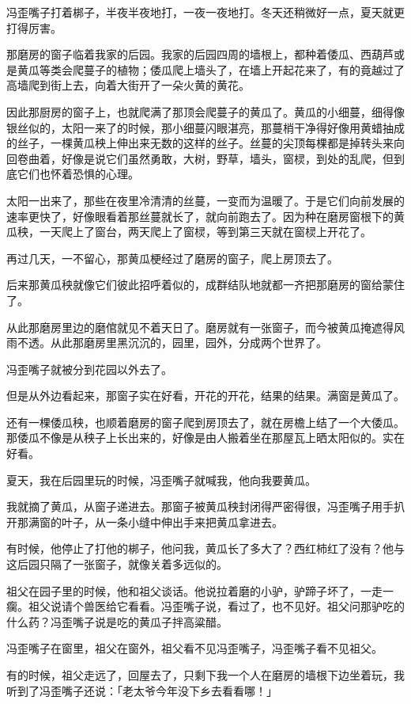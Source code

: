 \documentclass[UTF8]{ctexart}
\begin{document}
冯歪嘴子打着梆子，半夜半夜地打，一夜一夜地打。冬天还稍微好一点，夏天就更打得厉害。

那磨房的窗子临着我家的后园。我家的后园四周的墙根上，都种着倭瓜、西葫芦或是黄瓜等类会爬蔓子的植物；倭瓜爬上墙头了，在墙上开起花来了，有的竟越过了高墙爬到街上去，向着大街开了一朵火黄的黄花。

因此那厨房的窗子上，也就爬满了那顶会爬蔓子的黄瓜了。黄瓜的小细蔓，细得像银丝似的，太阳一来了的时候，那小细蔓闪眼湛亮，那蔓梢干净得好像用黄蜡抽成的丝子，一棵黄瓜秧上伸出来无数的这样的丝子。丝蔓的尖顶每棵都是掉转头来向回卷曲着，好像是说它们虽然勇敢，大树，野草，墙头，窗棂，到处的乱爬，但到底它们也怀着恐惧的心理。

太阳一出来了，那些在夜里冷清清的丝蔓，一变而为温暖了。于是它们向前发展的速率更快了，好像眼看着那丝蔓就长了，就向前跑去了。因为种在磨房窗根下的黄瓜秧，一天爬上了窗台，两天爬上了窗棂，等到第三天就在窗棂上开花了。

再过几天，一不留心，那黄瓜梗经过了磨房的窗子，爬上房顶去了。

后来那黄瓜秧就像它们彼此招呼着似的，成群结队地就都一齐把那磨房的窗给蒙住了。

从此那磨房里边的磨倌就见不着天日了。磨房就有一张窗子，而今被黄瓜掩遮得风雨不透。从此那磨房里黑沉沉的，园里，园外，分成两个世界了。

冯歪嘴子就被分到花园以外去了。

但是从外边看起来，那窗子实在好看，开花的开花，结果的结果。满窗是黄瓜了。

还有一棵倭瓜秧，也顺着磨房的窗子爬到房顶去了，就在房檐上结了一个大倭瓜。那倭瓜不像是从秧子上长出来的，好像是由人搬着坐在那屋瓦上晒太阳似的。实在好看。

夏天，我在后园里玩的时候，冯歪嘴子就喊我，他向我要黄瓜。

我就摘了黄瓜，从窗子递进去。那窗子被黄瓜秧封闭得严密得很，冯歪嘴子用手扒开那满窗的叶子，从一条小缝中伸出手来把黄瓜拿进去。

有时候，他停止了打他的梆子，他问我，黄瓜长了多大了？西红柿红了没有？他与这后园只隔了一张窗子，就像关着多远似的。

祖父在园子里的时候，他和祖父谈话。他说拉着磨的小驴，驴蹄子坏了，一走一瘸。祖父说请个兽医给它看看。冯歪嘴子说，看过了，也不见好。祖父问那驴吃的什么药？冯歪嘴子说是吃的黄瓜子拌高粱醋。

冯歪嘴子在窗里，祖父在窗外，祖父看不见冯歪嘴子，冯歪嘴子看不见祖父。

有的时候，祖父走远了，回屋去了，只剩下我一个人在磨房的墙根下边坐着玩，我听到了冯歪嘴子还说：「老太爷今年没下乡去看看哪！」
\end{document}

